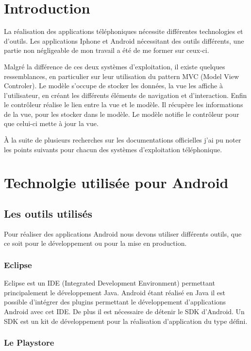\section{Introduction}

La réalisation des applications téléphoniques nécessite différentes technologies et d'outils. Les applications Iphone et Android nécessitant des outils différents, une partie non négligeable de mon travail a été de me former sur ceux-ci.

Malgré la différence de ces deux systèmes d'exploitation, il existe quelques ressemblances, en particulier sur leur utilisation du pattern MVC (Model View Controler). Le modèle s’occupe de stocker les données, la vue les affiche à l’utilisateur, en créant les différents éléments de navigation et d'interaction. Enfin le contrôleur réalise le lien entre la vue et le modèle. Il récupère les informations de la vue, pour les stocker dans le modèle. Le modèle notifie le contrôleur pour que celui-ci mette à jour la vue.

À la suite de plusieurs recherches sur les documentations officielles j'ai pu noter les points suivants pour chacun des systèmes d'exploitation téléphonique.

\section{Technolgie utilisée pour Android}

\subsection{Les outils utilisés}

Pour réaliser des applications Android nous devons utiliser différents outils, que ce soit pour le développement ou pour la mise en production.

\subsubsection{Eclipse}

Eclipse est un IDE (Integrated Development Environment) permettant principalement le développement Java. Android étant réalisé en Java il est possible d'intégrer des plugins permettant le développement d'applications Android avec cet IDE. De plus il est nécessaire de détenir le SDK d'Android. Un SDK est un kit de développement pour la réalisation d'application du type défini.

\subsubsection{Le Playstore}

